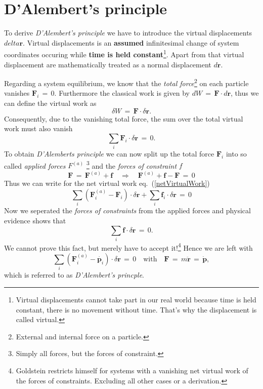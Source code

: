 \documentclass{report}
\renewcommand{\vec}[1]{\mathbf{#1}}
\begin{document}
\section{D'Alembert's principle}
To derive \textit{D'Alembert's principle} we have to introduce the virtual
displacements $delta \vec r$. Virtual displacements is an \textbf{assumed}
infinitesimal change of system coordinates occuring while \textbf{time is held
constant}\footnote{Virtual displacements cannot take part in our real world
because time is held constant, there is no movement without time. That's why
the displacement is called virtual.}. Apart from that virtual displacement are
mathematically treated as a normal displacement $d \vec r$. 

Regarding a system equilibrium, we know that the \textit{total
force}\footnote{External and internal force on a particle.} on each particle
vanishes $\vec F_i \,=\, 0$. Furthermore the classical work is given by $dW
\,=\, \vec F \cdot d \vec r$, thus we can define the virtual work as
\begin{equation}
  \delta W \,=\, \vec F \cdot \delta \vec r.
\end{equation}
Consequently, due to the vanishing total force, the sum over the total virtual
work must also vanish
\begin{equation}
  \label{netVirtualWork}
  \sum_{i} \vec F_i \cdot \delta \vec r \,=\, 0.
\end{equation}
To obtain \textit{D'Alemberts principle} we can now split up the total force
$\vec F_i$ into so called \textit{applied forces} $F^{(a)}$ \footnote{Simply all forces, but the
forces of constraint.} and the \textit{forces of constraint} $f$
\begin{equation}
  \vec F \,=\, \vec F^{(a)} + \vec f \quad \Rightarrow \quad \vec F^{(a)} +
\vec f - \vec F \,=\, 0 
\end{equation}
Thus we can write for the net virtual work eq.~(\ref{netVirtualWork})
\begin{equation}
  \sum_{i} (\vec F_i^{(a)} - \vec F_i) \cdot \delta \vec r + \sum_{i} \vec f_i \cdot \delta \vec r
\,=\, 0
\end{equation}
Now we seperated the \textit{forces of constraints} from the applied forces and
physical evidence shows that
\begin{equation}
  \sum_{i} \vec f \cdot \delta \vec r \,=\, 0.
\end{equation}
We cannot prove this fact, but merely have to accept it!\footnote{Goldstein
restricts himself for systems with a vanishing net virtual work of the forces
of constraints. Excluding all other cases or a derivation.} Hence we are left
with
\begin{equation}
  \label{dAlembertPrinciple}
  \sum_{i} (\vec F_i^{(a)} - \dot{\vec p_i}) \cdot \delta \vec r \,=\, 0 \quad
\text{with} \quad \vec F \,=\, m \ddot{\vec r} \,=\, \dot{\vec p},
\end{equation}
which is referred to as \textit{D'Alembert's princple}.
\end{document}
